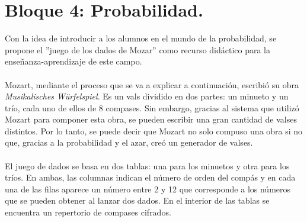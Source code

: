 \documentclass[a4paper, openright, 11pt, titlepage]{report}
\theoremstyle{definition}\newtheorem{defin}[propo]{Definition}
\theoremstyle{definition}\newtheorem{obser}[propo]{Remark}
\theoremstyle{definition}\newtheorem{ejem}[propo]{Ejemplo}
\theoremstyle{definition}\newtheorem{algoritmo}[propo]{Algoritmo}
\begin{document}
\begin{itemize}
    
\end{itemize}
\section{Bloque 4: Probabilidad.}
Con la idea de introducir a los alumnos en el mundo de la probabilidad, se propone el ''juego de los dados de Mozar'' como recurso didáctico para la enseñanza-aprendizaje de este campo.\\\\
Mozart, mediante el proceso que se va a explicar a continuación, escribió su obra \textit{Musikalisches Würfelspiel}. Es un vals dividido en dos partes: un minueto y un trío, cada uno de ellos de 8 compases. Sin embargo, gracias al sistema que utilizó Mozart para componer esta obra, se pueden escribir una gran cantidad de valses distintos. Por lo tanto, se puede decir que Mozart no solo compuso una obra si no que, gracias a la probabilidad y el azar, creó un generador de valses.\\\\
El juego de dados se basa en dos tablas: una para los minuetos y otra para los tríos. En ambas, las columnas indican el número de orden del compás y en cada una
de las filas aparece un número entre 2 y 12 que corresponde a los números que se pueden obtener al lanzar dos dados.
En el interior de las tablas se encuentra un repertorio de compases cifrados.
\end{document}
